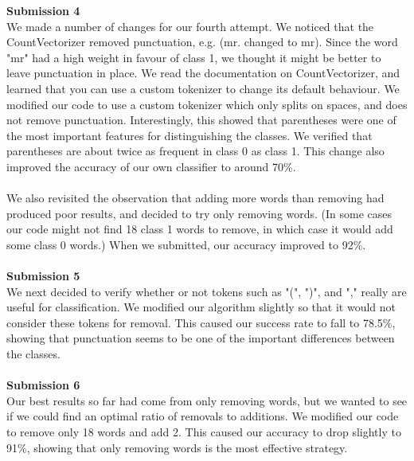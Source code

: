 \documentclass{article}
\begin{document}
\textbf{\large Submission 4} \\
We made a number of changes for our fourth attempt. We noticed that the CountVectorizer removed punctuation, e.g. (mr. changed to mr). Since the word "mr" had a high weight in favour of class 1, we thought it might be better to leave punctuation in place. We read the documentation on CountVectorizer, and learned that you can use a custom tokenizer to change its default behaviour. We modified our code to use a custom tokenizer which only splits on spaces, and does not remove punctuation. Interestingly, this showed that parentheses were one of the most important features for distinguishing the classes. We verified that parentheses are about twice as frequent in class 0 as class 1. This change also improved the accuracy of our own classifier to around 70\%. \\
\\
We also revisited the observation that adding more words than removing had produced poor results, and decided to try only removing words. (In some cases our code might not find 18 class 1 words to remove, in which case it would add some class 0 words.) When we submitted, our accuracy improved to 92\%. \\
\\
\textbf{\large Submission 5} \\
We next decided to verify whether or not tokens such as "(", ")", and "," really are useful for classification. We modified our algorithm slightly so that it would not consider these tokens for removal. This caused our success rate to fall to 78.5\%, showing that punctuation seems to be one of the important differences between the classes. \\
\\
\textbf{\large Submission 6} \\
Our best results so far had come from only removing words, but we wanted to see if we could find an optimal ratio of removals to additions. We modified our code to remove only 18 words and add 2. This caused our accuracy to drop slightly to 91\%, showing that only removing words is the most effective strategy. \\


\end{document}
